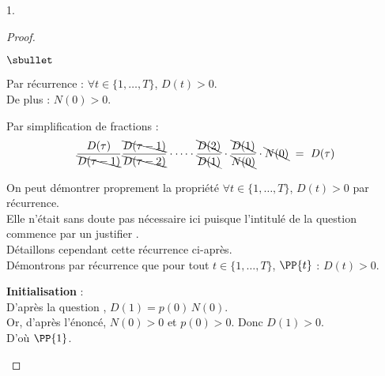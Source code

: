 \begin{noliste}{1.}
  \begin{proof}~
    \begin{noliste}{$\sbullet$}
      \item Par récurrence : $\forall t \in \{1, \ldots, T\}$, 
      $D(t) >0$.\\
      De plus : $N(0)>0$.
      
      
      \newpage
      
      
      \item Par simplification de fractions :
      \[
	\dfrac{D(\tau)}{\bcancel{D(\tau-1)}}
        \dfrac{\bcancel{D(\tau-1)}}{\bcancel{D(\tau-2)}} 
        \cdot \cdots \cdot 
	\dfrac{\bcancel{D(2)}}{\bcancel{D(1)}}
	\cdot \dfrac{\bcancel{D(1)}}{\bcancel{N(0)}} 
	\cdot \bcancel{N(0)}
	\ = \ D(\tau)
      \]
    \end{noliste}
    
    \begin{remark}
      On peut démontrer proprement la propriété \og $\forall t \in 
      \{1, \ldots, T\}$, $D(t) >0$ par récurrence.\\
      Elle n'était sans doute pas nécessaire ici puisque l'intitulé de 
      la question commence par un \og justifier \fg{}.\\
      Détaillons cependant cette récurrence ci-après.\\
      Démontrons par récurrence que pour tout $t \in \{1, \ldots, T\}$,
      $\PP{t}$ : $D(t) >0$.
      \begin{noliste}{\fitem}
        \item {\bf Initialisation} :\\
        D'après la question , $D(1) = p(0) \, N(0)$.\\
        Or, d'après l'énoncé, $N(0)>0$ et $p(0)>0$. Donc $D(1) >0$.\\
        D'où $\PP{1}$.
        

\end{noliste}
\end{remark}
\end{proof}
\end{noliste}
